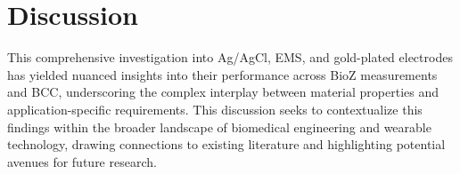 \documentclass[conference]{IEEEtran}
\begin{document}

\section{Discussion}

This comprehensive investigation into Ag/AgCl, \gls{EMS}, and gold-plated electrodes has yielded nuanced insights into their performance across \gls{BioZ} measurements and \gls{BCC}, underscoring the complex interplay between material properties and application-specific requirements. This discussion seeks to contextualize this findings within the broader landscape of biomedical engineering and wearable technology, drawing connections to existing literature and highlighting potential avenues for future research.
\end{document}

